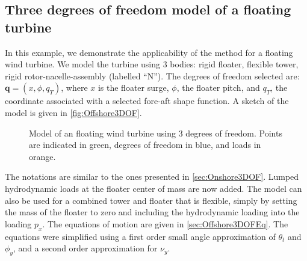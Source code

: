 \documentclass[wes, manuscript]{copernicus}
\renewcommand{\v}[1]{\boldsymbol{#1}}
\begin{document}
\subsection{Three degrees of freedom model of a floating turbine}
\label{sec:Offshore3DOF}
In this example, we demonstrate the applicability of the method for a floating wind turbine.
We model the turbine using 3 bodies: rigid floater, flexible tower, rigid rotor-nacelle-assembly (labelled ``N'').
The degrees of freedom selected are: $\v{q}=(x,\phi,q_T)$, where $x$ is the floater surge, $\phi$, the floater pitch, and $q_T$, the coordinate associated with a selected fore-aft shape function. 
A sketch of the model is given in \autoref{fig:Offshore3DOF}. 
\begin{figure}[!htb]%
 \centering%
 \def\svgwidth{0.6\columnwidth}%
 \caption{Model of an floating wind turbine using 3 degrees of freedom. Points are indicated in green, degrees of freedom in blue, and loads in orange.}\label{fig:Offshore3DOF}%
 \end{figure}%
The notations are similar to the ones presented in \autoref{sec:Onshore3DOF}.
Lumped hydrodynamic loads at the floater center of mass are now added.
The model can also be used for a combined tower and floater that is flexible, simply by setting the mass of the floater to zero and including the hydrodynamic loading into the loading $p_x$.
The equations of motion are given in \autoref{sec:Offshore3DOFEq}.
The equations were simplified using a first order small angle approximation of $\theta_t$ and $\phi_y$, and a second order approximation for $\nu_y$.
\end{document}
